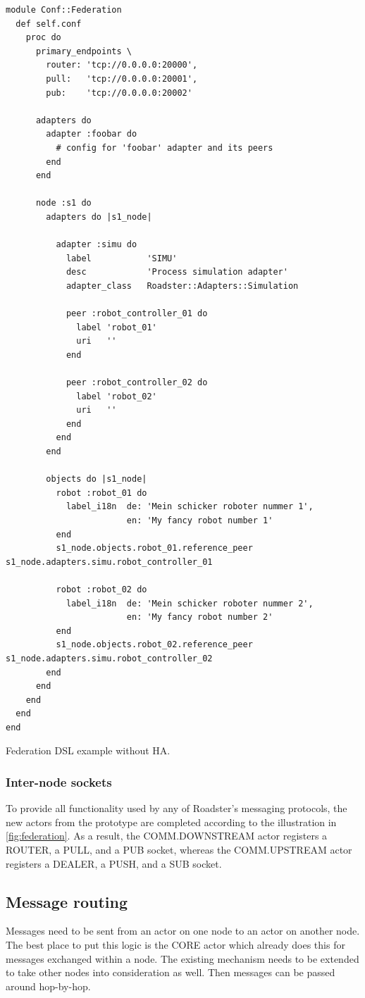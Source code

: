 \begin{listing}
	\begin{verbatim}
module Conf::Federation
  def self.conf
    proc do
      primary_endpoints \
        router: 'tcp://0.0.0.0:20000',
        pull:   'tcp://0.0.0.0:20001',
        pub:    'tcp://0.0.0.0:20002'

      adapters do
        adapter :foobar do
          # config for 'foobar' adapter and its peers
        end
      end

      node :s1 do
        adapters do |s1_node|

          adapter :simu do
            label           'SIMU'
            desc            'Process simulation adapter'
            adapter_class   Roadster::Adapters::Simulation

            peer :robot_controller_01 do
              label 'robot_01'
              uri   ''
            end

            peer :robot_controller_02 do
              label 'robot_02'
              uri   ''
            end
          end
        end

        objects do |s1_node|
          robot :robot_01 do
            label_i18n  de: 'Mein schicker roboter nummer 1',
                        en: 'My fancy robot number 1'
          end
          s1_node.objects.robot_01.reference_peer s1_node.adapters.simu.robot_controller_01

          robot :robot_02 do
            label_i18n  de: 'Mein schicker roboter nummer 2',
                        en: 'My fancy robot number 2'
          end
          s1_node.objects.robot_02.reference_peer s1_node.adapters.simu.robot_controller_02
        end
      end
    end
  end
end
	\end{verbatim}
	\caption{Federation DSL example without HA.}
	\label{lst:dsl:topo:no-ha}
\end{listing}


\subsubsection{Inter-node sockets}
To provide all functionality used by any of Roadster's messaging protocols, the
new actors from the prototype are completed according to the illustration in
\autoref{fig:federation}. As a result, the COMM.DOWNSTREAM actor registers a
ROUTER, a PULL, and a PUB socket, whereas the COMM.UPSTREAM actor registers a
DEALER, a PUSH, and a SUB socket.

\subsection{Message routing}\label{sec:approach:msg-routing}
Messages need to be sent from an actor on one node to an actor on another node.
The best place to put this logic is the CORE actor which already does this for
messages exchanged within a node. The existing mechanism needs to be extended to take other nodes
into consideration as well. Then messages can be passed around hop-by-hop.

